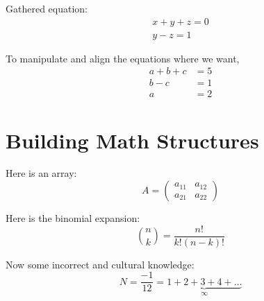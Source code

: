 \documentclass{article}
\begin{document}
    Gathered equation:
    \begin{gather}
        x+y+z = 0 \\
        y - z = 1
    \end{gather}

    To manipulate and align the equations where we want,
    \begin{align}
        a + b + c &= 5 \\
        b-c &= 1 \\
        a &= 2
    \end{align}

    \section*{Building Math Structures}
    Here is an array:
    \[
        A =  \left( 
            \begin{array}{cc}
                a_{11} & a_{12} \\
                a_{21} & a_{22}
            \end{array} 
        \right)
    \]

    Here is the binomial expansion:
    \[
        \binom{n}{k} = \frac{n!}{k!(n-k)!}
    \]

    Now some incorrect and cultural knowledge:
    \[
        N=\frac{-1}{12}=\underbrace{1+2+3+4+ \ldots}_{\infty}
    \]
\end{document}
